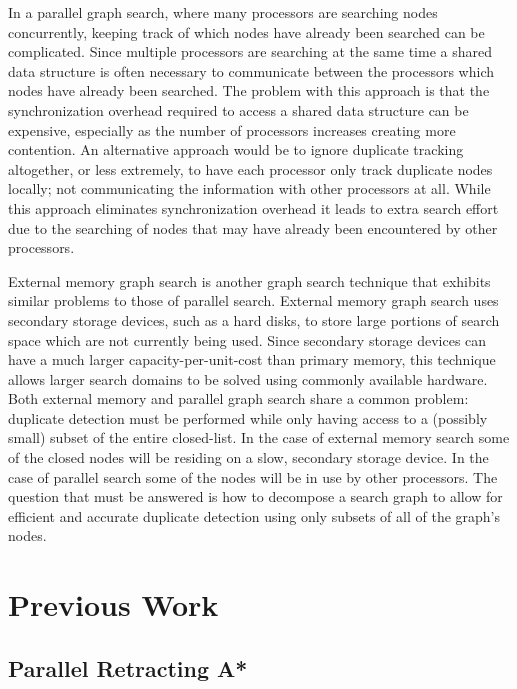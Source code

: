 \documentclass{article}
\begin{document}
In a parallel graph search, where many processors are searching nodes
concurrently, keeping track of which nodes have already been searched
can be complicated.  Since multiple processors are searching at the
same time a shared data structure is often necessary to communicate
between the processors which nodes have already been searched.  The
problem with this approach is that the synchronization overhead
required to access a shared data structure can be expensive,
especially as the number of processors increases creating more
contention.  An alternative approach would be to ignore duplicate
tracking altogether, or less extremely, to have each processor only
track duplicate nodes locally; not communicating the information with
other processors at all.  While this approach eliminates
synchronization overhead it leads to extra search effort due to the
searching of nodes that may have already been encountered by other
processors.

External memory graph search is another graph search technique that
exhibits similar problems to those of parallel search.  External
memory graph search uses secondary storage devices, such as a hard
disks, to store large portions of search space which are not currently
being used.  Since secondary storage devices can have a much larger
capacity-per-unit-cost than primary memory, this technique allows
larger search domains to be solved using commonly available hardware.
Both external memory and parallel graph search share a common problem:
duplicate detection must be performed while only having access to a
(possibly small) subset of the entire closed-list.  In the case of
external memory search some of the closed nodes will be residing on a
slow, secondary storage device.  In the case of parallel search some
of the nodes will be in use by other processors.  The question that
must be answered is how to decompose a search graph to allow for
efficient and accurate duplicate detection using only subsets of all
of the graph's nodes.

\section{Previous Work}

\subsection{Parallel Retracting A*}
\end{document}
